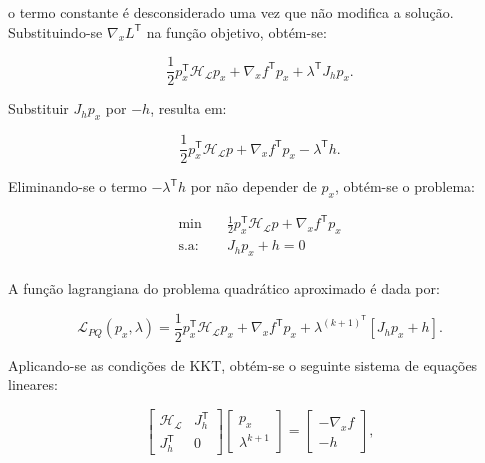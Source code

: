 \documentclass[
	12pt,				%
	openany,			%
	twoside,			%
	a4paper,			%
	chapter=TITLE,		%
	section=Title,		%
	subsection=Title,	%
	subsubsection=Title,%
	english,			%
	french,				%
	spanish,			%
	brazil			%
	]{abntex2}
\begin{document}
\begin{ERRATA}
\noindent o termo constante é desconsiderado uma vez que não modifica a solução. Substituindo-se $\nabla_xL^\mathsf{T}$ na função objetivo, obtém-se:

\begin{equation}
\frac{1}{2}p_x^\mathsf{T}\mathcal{H_L}p_x + \nabla_xf^\mathsf{T}p_x + \lambda^\mathsf{T}J_hp_x.
\end{equation}

Substituir $J_hp_x$ por $-h$, resulta em:

\begin{equation}
\frac{1}{2}p_x^\mathsf{T}\mathcal{H_L}p + \nabla_xf^\mathsf{T}p_x  -\lambda^\mathsf{T}h.
\end{equation}

Eliminando-se o termo $-\lambda^\mathsf{T}h$ por não depender de $p_x$, obtém-se o problema:

\begin{equation} \label{qpnl}
\begin{aligned}
\text{min}  & \quad \frac{1}{2}p_x^\mathsf{T}\mathcal{H_L}p + \nabla_xf^\mathsf{T}p_x \\
\text{s.a:} &\quad   J_hp_x + h =0\\
\end{aligned}
\end{equation}

A função lagrangiana do problema quadrático aproximado é dada por:

\begin{equation} \label{LL}
\mathcal{L}_{PQ}(p_x, \lambda) = \frac{1}{2}p_x^\mathsf{T}\mathcal{H_L}p_x + \nabla_xf^\mathsf{T}p_x + \lambda^{(k+1)}^\mathsf{T}[J_hp_x + h].
\end{equation}

Aplicando-se as condições de KKT, obtém-se o seguinte sistema de equações lineares:

\begin{equation} \label{sis}
\begin{bmatrix}
\mathcal{H_L} & J_h^\mathsf{T}\\
J_h^\mathsf{T} & 0
\end{bmatrix}
\begin{bmatrix}
p_x\\
\lambda^{k+1}
\end{bmatrix}
= 
\begin{bmatrix}
-\nabla_x f\\
-h
\end{bmatrix},
\end{equation}


\end{ERRATA}
\end{document}
